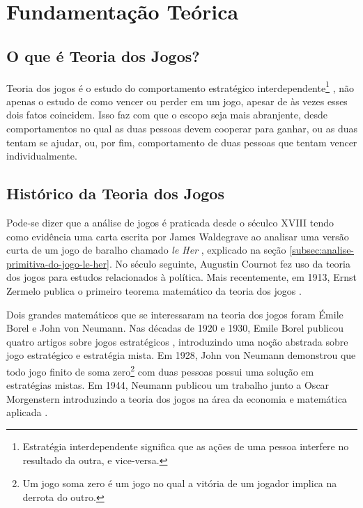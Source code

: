 \chapter[Fundamentação Teórica]{Fundamentação Teórica}
\label{cha:fundamentacao-teorica}

\section{O que é Teoria dos Jogos?}
\label{sec:o-que-e-teoria-dos-jogos}

Teoria dos jogos é o estudo do comportamento estratégico interdependente\footnote{Estratégia interdependente significa que as ações de uma pessoa interfere no resultado da outra, e vice-versa.} \cite{spaniel_2011}, não apenas o estudo de como vencer ou perder em um jogo, apesar de às vezes esses dois fatos coincidem. Isso faz com que o escopo seja mais abranjente, desde comportamentos no qual as duas pessoas devem cooperar para ganhar, ou as duas tentam se ajudar, ou, por fim, comportamento de duas pessoas que tentam vencer individualmente.

\section{Histórico da Teoria dos Jogos}
\label{sec:historico-da-teoria-dos-jogos}

Pode-se dizer que a análise de jogos é praticada desde o séculco XVIII tendo como evidência uma carta escrita por James Waldegrave ao analisar uma versão curta de um jogo de baralho chamado \emph{le Her} \cite[p.~2]{Prague_severalmilestones}, explicado na seção \ref{subsec:analise-primitiva-do-jogo-le-her}. No século seguinte, Augustin Cournot fez uso da teoria dos jogos para estudos relacionados à política. Mais recentemente, em 1913, Ernst Zermelo publica o primeiro teorema matemático da teoria dos jogos \cite[p.~2]{sartini_IIbienaldasbm}.

Dois grandes matemáticos que se interessaram na teoria dos jogos foram Émile Borel e John von Neumann. Nas décadas de 1920 e 1930, Emile Borel publicou quatro artigos sobre jogos estratégicos \cite[p.~2]{Prague_severalmilestones}, introduzindo uma noção abstrada sobre jogo estratégico e estratégia mista. Em 1928, John von Neumann demonstrou que todo jogo finito de soma zero\footnote{Um jogo soma zero é um jogo no qual a vitória de um jogador implica na derrota do outro.} com duas pessoas possui uma solução em estratégias mistas. Em 1944, Neumann publicou um trabalho junto a Oscar Morgenstern introduzindo a teoria dos jogos na área da economia e matemática aplicada \cite[p.~2--3]{sartini_IIbienaldasbm}.

